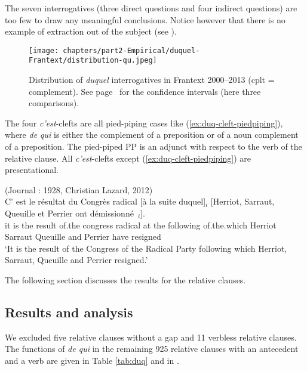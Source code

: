 The seven interrogatives (three direct questions and four indirect questions) are too few to draw any meaningful conclusions. Notice however that there is no example of extraction out of the subject (see ).

\begin{figure}
    \texttt{[image: chapters/part2-Empirical/duquel-Frantext/distribution-qu.jpeg]}
    \caption{Distribution of \emph{duquel} interrogatives in Frantext 2000--2013 (cplt = complement). See page~\pageref{ch:conf-intervals-binomial} for the confidence intervals (here three comparisons).}
    \label{fig:duq-wh}
\end{figure}

The four \emph{c'est}-clefts are all pied-piping cases like (\ref{ex:duq-cleft-piedpiping}), where \emph{de qui} is either the complement of a preposition or of a noun complement of a preposition. The pied-piped PP is an adjunct with respect to the verb of the relative clause. All \emph{c'est}-clefts except (\ref{ex:duq-cleft-piedpiping}) are presentational.

\ea (Journal : 1928, Christian Lazard, 2012)\\
\gll C’ est le résultat du Congrès radical [à la suite duquel]$_i$ [Herriot, Sarraut, Queuille et Perrier ont démissionné~\trace{}$_i$].\\
it is the result of.the congress radical at the following of.the.which Herriot Sarraut Queuille and Perrier have resigned\\
\glt `It is the result of the Congress of the Radical Party following which Herriot, Sarraut, Queuille and Perrier resigned.'
\label{ex:duq-cleft-piedpiping}
\z  

The following section discusses the results for the relative clauses.

\subsection{Results and analysis}

We excluded five relative clauses without a gap and 11 verbless relative clauses. The functions of \emph{de qui} in the remaining 925 relative clauses with an antecedent and a verb are given in Table \ref{tab:duq} and in .

